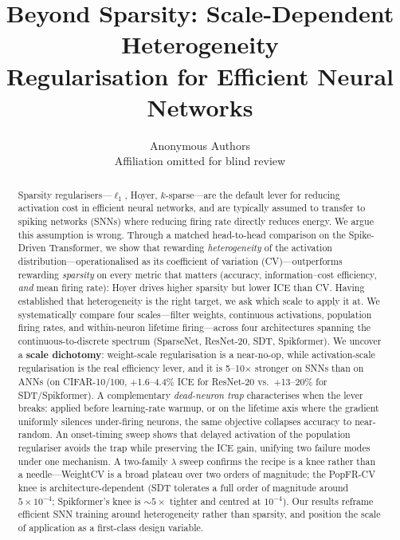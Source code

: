 \documentclass{article}
\title{Beyond Sparsity: Scale-Dependent Heterogeneity \\
Regularisation for Efficient Neural Networks}
\author{%
  Anonymous Authors \\
  Affiliation omitted for blind review \\
}
\begin{document}
\maketitle


\begin{abstract}
Sparsity regularisers---$\ell_1$, Hoyer, $k$-sparse---are the default lever for reducing activation cost in efficient neural networks, and are typically assumed to transfer to spiking networks (SNNs) where reducing firing rate directly reduces energy. We argue this assumption is wrong. Through a matched head-to-head comparison on the Spike-Driven Transformer, we show that rewarding \emph{heterogeneity} of the activation distribution---operationalised as its coefficient of variation (CV)---outperforms rewarding \emph{sparsity} on every metric that matters (accuracy, information--cost efficiency, \emph{and} mean firing rate): Hoyer drives higher sparsity but lower ICE than CV. Having established that heterogeneity is the right target, we ask which scale to apply it at. We systematically compare four scales---filter weights, continuous activations, population firing rates, and within-neuron lifetime firing---across four architectures spanning the continuous-to-discrete spectrum (SparseNet, ResNet-20, SDT, Spikformer). We uncover a \textbf{scale dichotomy}: weight-scale regularisation is a near-no-op, while activation-scale regularisation is the real efficiency lever, and it is 5--10$\times$ stronger on SNNs than on ANNs (on CIFAR-10/100, $+$1.6--4.4\% ICE for ResNet-20 vs.\ $+$13--20\% for SDT/Spikformer). A complementary \emph{dead-neuron trap} characterises when the lever breaks: applied before learning-rate warmup, or on the lifetime axis where the gradient uniformly silences under-firing neurons, the same objective collapses accuracy to near-random. An onset-timing sweep shows that delayed activation of the population regulariser avoids the trap while preserving the ICE gain, unifying two failure modes under one mechanism. A two-family $\lambda$ sweep confirms the recipe is a knee rather than a needle---WeightCV is a broad plateau over two orders of magnitude; the PopFR-CV knee is architecture-dependent (SDT tolerates a full order of magnitude around $5\!\times\!10^{-4}$; Spikformer's knee is $\sim 5\times$ tighter and centred at $10^{-4}$). Our results reframe efficient SNN training around heterogeneity rather than sparsity, and position the scale of application as a first-class design variable.
\end{abstract}
\end{document}
